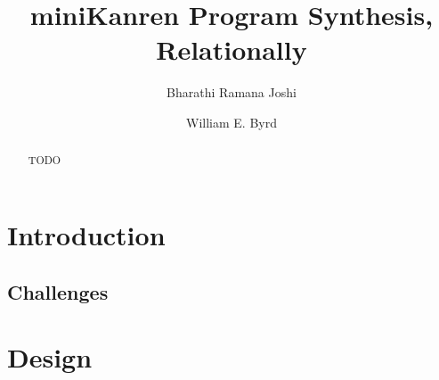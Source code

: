 \documentclass[sigplan,screen]{acmart}
\begin{document}
\title{miniKanren Program Synthesis, Relationally}
\author{Bharathi Ramana Joshi}
\author{William E. Byrd}

\renewcommand{\shortauthors}{Joshi and Byrd}
\begin{abstract}
  TODO
\end{abstract}



\maketitle

\section{Introduction}
\label{sec:intro}


\subsection{Challenges}
\label{subsec:challenges}


\section{Design}
\label{sec:design}





% 
% 
% 
\end{document}
